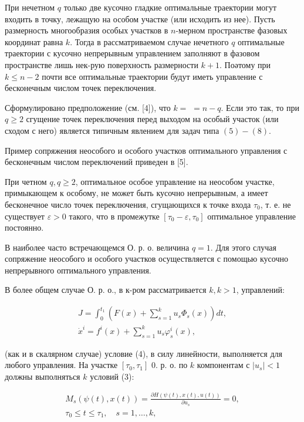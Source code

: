 \documentclass[10pt]{article}
\begin{document}
При нечетном $q$ только две кусочно гладкие оптимальные траектории могут входить в точку, лежащую на особом участке (или исходить из нее). Пусть размерность многообразия особых участков в $n$-мерном пространстве фазовых координат равна $k$. Тогда в рассматриваемом случае нечетного $q$ оптимальные траектории с кусочно непрерывным управлением заполняют в фазовом пространстве лишь нек-рую поверхность размерности $k+1$. Поәтому при $k \leqslant n-2$ почти все оптимальные траектории будут иметь управление с бесконечным числом точек переключения.

Сформулировано предположение (см. [4]), что $k=$ $=n-q$. Если это так, то при $q \geqslant 2$ сгущение точек переключения перед выходом на особый участок (или сходом с него) является типичным явлением для задач типа $(5)-(8)$.

Пример сопряжения неособого и особого участков оптимального управления с бесконечным числом переключений приведен в [5].

При четном $q, q \geqslant 2$, оптимальное особое управление на неособом участке, примыкающем к особому, не может быть кусочно непрерывным, а имеет бесконечное число точек переключения, сгущающихся к точке входа $\tau_{0}$, т. е. не существует $\varepsilon>0$ такого, что в промежутке $\left[\tau_{0}-\varepsilon, \tau_{0}\right]$ оптимальное управление постоянно.

В наиболее часто встречающемся О. р. о. величина $q=1$. Для этого случая сопряжение неособого и особого участков осуществляется с помощью кусочно непрерывного оптимального управления.

В более общем случае О. р. о., в к-ром рассматривается $k, k>1$, управлений:

\[
\begin{gathered}
J=\int_{0}^{t_{1}}\left(F(x)+\sum_{s=1}^{k} u_{s} \Phi_{s}(x)\right) d t, \\
\dot{x}^{i}=f^{i}(x)+\sum_{s=1}^{k} u_{s} \varphi_{s}^{i}(x),
\end{gathered}
\]

(как и в скалярном случае) условие (4), в силу линейности, выполняется для любого управления. На участке $\left[\tau_{0}, \tau_{1}\right]$ 0. р. о. по $k$ компонентам с $\left|u_{s}\right|<1$ должны выполняться $k$ условий (3):

\[
\begin{gathered}
M_{s}(\psi(t), x(t))=\frac{\partial H(\psi(t), x(t), u(t))}{\partial u_{s}}=0, \\
\tau_{0} \leqslant t \leqslant \tau_{1}, \quad s=1, \ldots, k,
\end{gathered}
\]
\end{document}
